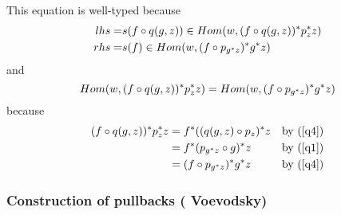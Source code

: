 \documentclass[10pt,a4paper]{scrartcl}
\begin{document}
\noindent
This equation is well-typed because
\begin{align*}
      lhs = &s(f \circ q(g,z)) \in Hom(w,(f \circ q(g,z) ) ^* p_z ^* z ) \\
      rhs = &s(f) \in Hom(w,(f \circ   p_{g ^* z} ) ^*  g ^* z  )\\
\end{align*}
and
\begin{equation*}
     Hom(w,(f \circ q(g,z) ) ^* p_z ^* z ) = Hom(w,(f \circ   p_{g ^* z} ) ^*  g ^* z )
\end{equation*}
because
\begin{align*}
(f \circ q(g,z) ) ^* p_z ^* z 
                 & = f ^* ((q(g,z) \circ p_z) ^* z &\mbox{by (\ref{q4})}\\
                 & = f ^* ( p_{g ^* z} \circ g ) ^* z&\mbox{by (\ref{q1})}\\
                 & = (f \circ   p_{g ^* z} ) ^*  g ^* z&\mbox{by (\ref{q4})}
\end{align*}

\subsubsection{Construction of pullbacks ( Voevodsky)}
\end{document}
